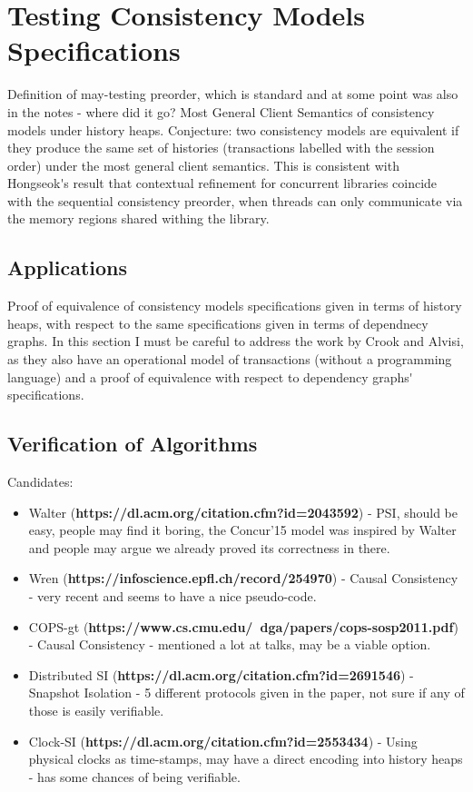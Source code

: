 \documentclass[a4paper,UKenglish]{article}%
\theoremstyle{plain}
\begin{document}
\section{Testing Consistency Models Specifications}
\ac{Definition of may-testing preorder, which is standard and at some point 
was also in the notes - where did it go? Most General Client Semantics of consistency 
models under history heaps. Conjecture: two consistency models are equivalent if they 
produce the same set of histories (transactions labelled with the session order) under 
the most general client semantics. This is consistent with Hongseok's result that contextual 
refinement for concurrent libraries coincide with 
the sequential consistency preorder, when threads can only communicate via the memory regions 
shared withing the library.}

\subsection{Applications}
\ac{Proof of equivalence of consistency models specifications given in terms of history heaps, 
with respect to the same specifications given in terms of dependnecy graphs. In this section 
I must be careful to address the work by Crook and Alvisi, as they also have an operational model 
of transactions (without a programming language) and a proof of equivalence with respect to 
dependency graphs' specifications.}

\subsection{Verification of Algorithms} 
Candidates: 
\begin{itemize}
\item Walter (\textbf{https://dl.acm.org/citation.cfm?id=2043592}) - PSI, should be easy, 
people may find it boring, the Concur'15 model was inspired by Walter and people may argue we 
already proved its correctness in there.
\item Wren (\textbf{https://infoscience.epfl.ch/record/254970}) - Causal Consistency - very recent and seems to have 
a nice pseudo-code.\\
\item COPS-gt (\textbf{https://www.cs.cmu.edu/~dga/papers/cops-sosp2011.pdf}) - Causal Consistency -  mentioned a lot at 
talks, may be a viable option.
\item Distributed SI (\textbf{https://dl.acm.org/citation.cfm?id=2691546}) - Snapshot Isolation - 5 different protocols given in the paper, 
not sure if any of those is easily verifiable.\\ 
\item Clock-SI (\textbf{https://dl.acm.org/citation.cfm?id=2553434}) - Using physical clocks as time-stamps, may have a direct encoding 
into history heaps - has some chances of being verifiable.
\end{itemize}
\end{document}
